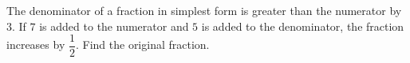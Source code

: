 The denominator of a fraction in simplest form is greater than the numerator by $3$. If $7$ is added to the numerator and $5$ is added to the denominator, the fraction increases by $\dfrac{1}{2}$. Find the original fraction.
